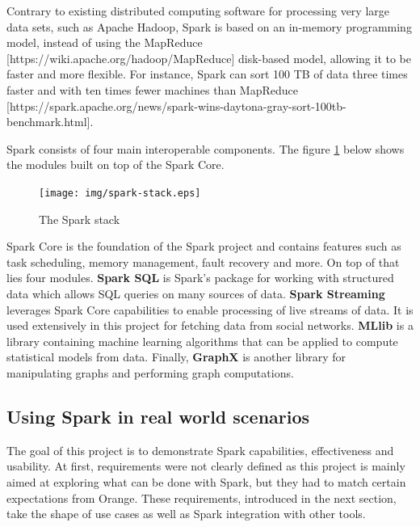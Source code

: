\documentclass[11pt]{article}
\begin{document}
Contrary to existing distributed computing software for processing very large data sets, such as \textsf{Apache Hadoop}, \textsf{Spark} is based on an in-memory programming model, instead of using the \textsf{MapReduce} [https://wiki.apache.org/hadoop/MapReduce] disk-based model, allowing it to be faster and more flexible. For instance, \textsf{Spark} can sort 100 TB of data three times faster and with ten times fewer machines than \textsf{MapReduce} [https://spark.apache.org/news/spark-wins-daytona-gray-sort-100tb-benchmark.html].

\newpage
\textsf{Spark} consists of four main interoperable components. The figure \ref{spark-stack} below shows the modules built on top of the \textsf{Spark Core}.

\begin{figure}[h!]
    \centering
    \texttt{[image: img/spark-stack.eps]}
    \caption{The Spark stack}
    \label{spark-stack}
\end{figure}

\textsf{Spark Core} is the foundation of the \textsf{Spark} project and contains features such as task scheduling, memory management, fault recovery and more. On top of that lies four modules.
\textsf{\textbf{Spark SQL}} is \textsf{Spark}'s package for working with structured data which allows \textsf{SQL} queries on many sources of data.
\textsf{\textbf{Spark Streaming}} leverages \textsf{Spark Core} capabilities to enable processing of live streams of data. It is used extensively in this project for fetching data from social networks.
\textsf{\textbf{MLlib}} is a library containing machine learning algorithms that can be applied to compute statistical models from data.
Finally, \textsf{\textbf{GraphX}} is another library for manipulating graphs and performing graph computations. 

\subsection{Using Spark in real world scenarios}
The goal of this project is to demonstrate \textsf{Spark} capabilities, effectiveness and usability. At first, requirements were not clearly defined as this project is mainly aimed at exploring what can be done with \textsf{Spark}, but they had to match certain expectations from \textsf{Orange}. These requirements, introduced in the next section, take the shape of use cases as well as \textsf{Spark} integration with other tools.
\end{document}
